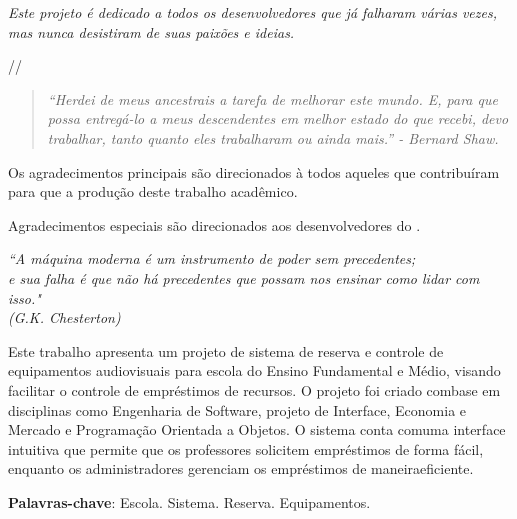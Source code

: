 \documentclass[
	12pt,				%
	openright,			%
	twoside,			%
	a4paper,			%
	english,			%
	french,				%
	spanish,			%
	brazil				%
	]{abntex2}
\begin{document}
\begin{dedicatoria}
   \vspace*{\fill}
   \centering
   \noindent
   \textit{Este projeto é dedicado a todos os desenvolvedores que já falharam várias vezes, mas nunca desistiram de suas paixões e ideias.}

   //

   \begin{quote}
	\textit{``Herdei de meus ancestrais a tarefa de melhorar este mundo. E, para que possa entregá-lo a meus descendentes em melhor estado do que recebi, devo trabalhar, tanto quanto eles trabalharam ou ainda mais.'' - Bernard Shaw.}
   \end{quote}

   \vspace*{\fill}

\end{dedicatoria}

\begin{agradecimentos}
Os agradecimentos principais são direcionados à todos aqueles que contribuíram para que a produção deste trabalho acadêmico.

Agradecimentos especiais são direcionados aos desenvolvedores do \abnTeX.

\end{agradecimentos}

\begin{epigrafe}
	\vspace*{\fill}
	\begin{flushright}
		\textit{``A máquina moderna é um instrumento de poder sem precedentes;\\ e sua falha é que não há precedentes que possam nos ensinar como lidar com isso." \\
		(G.K. Chesterton)}
	\end{flushright}
\end{epigrafe}


\setlength{\absparsep}{18pt} %
\begin{resumo}
 Este trabalho apresenta um projeto de sistema de reserva e controle de
equipamentos audiovisuais para escola do Ensino Fundamental e Médio, visando
facilitar o controle de empréstimos de recursos. O projeto foi criado combase em
disciplinas como Engenharia de Software, projeto de Interface, Economia e
Mercado e Programação Orientada a Objetos. O sistema conta comuma interface
intuitiva que permite que os professores solicitem empréstimos de forma fácil,
enquanto os administradores gerenciam os empréstimos de maneiraeficiente.

 \textbf{Palavras-chave}:  Escola. Sistema. Reserva. Equipamentos.
\end{resumo}
\end{document}
